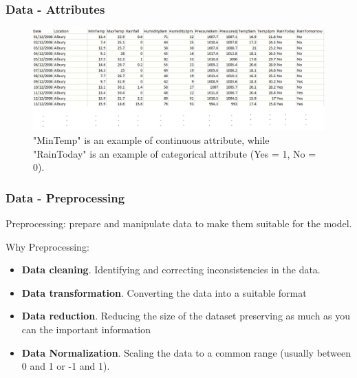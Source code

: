 \documentclass{beamer}
\begin{document}
	\begin{frame}
		\frametitle{Data - Attributes}
		\begin{figure}
			\centering
			\includegraphics[scale=0.3]{images/data-attributes}
			\caption{"MinTemp" is an example of continuous attribute, while "RainToday" is an example of categorical attribute (Yes = 1, No = 0).}
		\end{figure}
	\end{frame}

	\begin{frame}
		\frametitle{Data - Preprocessing}
		Preprocessing: prepare and manipulate data to make them suitable for the model.
		
		Why Preprocessing:
		\begin{itemize}
			\item \textbf{Data cleaning}. Identifying and correcting inconsistencies in the data.
			\item \textbf{Data transformation}. Converting the data into a suitable format
			\item \textbf{Data reduction}. Reducing the size of the dataset preserving as much as you can the important information
			\item \textbf{Data Normalization}. Scaling the data to a common range (usually between 0 and 1 or -1 and 1).
		\end{itemize}
	\end{frame}
	
\end{document}

